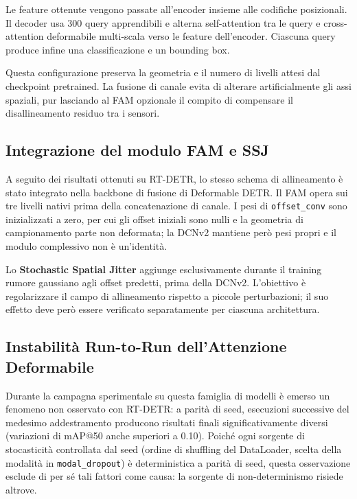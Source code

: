 \documentclass[a4paper,11pt]{article}
\begin{document}
Le feature ottenute vengono passate all'encoder insieme alle codifiche posizionali. Il decoder usa 300 query apprendibili e alterna self-attention tra le query e cross-attention deformabile multi-scala verso le feature dell'encoder. Ciascuna query produce infine una classificazione e un bounding box.

Questa configurazione preserva la geometria e il numero di livelli attesi dal checkpoint pretrained. La fusione di canale evita di alterare artificialmente gli assi spaziali, pur lasciando al FAM opzionale il compito di compensare il disallineamento residuo tra i sensori.

\subsection{Integrazione del modulo FAM e SSJ}
A seguito dei risultati ottenuti su RT-DETR, lo stesso schema di allineamento è stato integrato nella backbone di fusione di Deformable DETR. Il FAM opera sui tre livelli nativi prima della concatenazione di canale. I pesi di \texttt{offset\_conv} sono inizializzati a zero, per cui gli offset iniziali sono nulli e la geometria di campionamento parte non deformata; la DCNv2 mantiene però pesi propri e il modulo complessivo non è un'identità.

Lo \textbf{Stochastic Spatial Jitter} aggiunge esclusivamente durante il training rumore gaussiano agli offset predetti, prima della DCNv2. L'obiettivo è regolarizzare il campo di allineamento rispetto a piccole perturbazioni; il suo effetto deve però essere verificato separatamente per ciascuna architettura.

\subsection{Instabilità Run-to-Run dell'Attenzione Deformabile}
\label{sec:instabilita_deformable}

Durante la campagna sperimentale su questa famiglia di modelli è emerso un fenomeno non osservato con RT-DETR: a parità di seed, esecuzioni successive del medesimo addestramento producono risultati finali significativamente diversi (variazioni di mAP@50 anche superiori a 0.10). Poiché ogni sorgente di stocasticità controllata dal seed (ordine di shuffling del DataLoader, scelta della modalità in \texttt{modal\_dropout}) è deterministica a parità di seed, questa osservazione esclude di per sé tali fattori come causa: la sorgente di non-determinismo risiede altrove.
\end{document}
